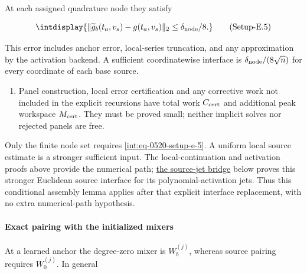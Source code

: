 
At each assigned quadrature node they satisfy


\label{int:eq-setup-e-5}
\begingroup\renewcommand{\theHequation}{intdisplay.1005}
\begin{equation}
\intdisplay{
\|\widetilde g_b(t_a,v_s)-g(t_a,v_s)\|_2
                         \le\delta_{\rm node}/8.
}
\tag{Setup-E.5}
\label{int:eq-0520-setup-e-5}
\end{equation}
\endgroup


This error includes anchor error, local-series truncation, and any approximation by the activation backend. A sufficient coordinatewise interface is \(\delta_{\rm node}/(8\sqrt n)\) for every coordinate of each base source.


\begin{enumerate}
\item[3.] Panel construction, local error certification and any corrective work not included in the explicit recursions have total work \(C_{\rm cert}\) and additional peak workspace \(M_{\rm cert}\). They must be proved small; neither implicit solves nor rejected panels are free.
\end{enumerate}


Only the finite node set requires \hyperref[int:eq-setup-e-5]{\eqref{int:eq-0520-setup-e-5}}. A uniform local source estimate is a stronger sufficient input. The local-continuation and activation proofs above provide the numerical path; \hyperref[int:setup-bridge]{the source-jet bridge} below proves this stronger Euclidean source interface for its polynomial-activation jets. Thus this conditional assembly lemma applies after that explicit interface replacement, with no extra numerical-path hypothesis.


\paragraph{Exact pairing with the initialized mixers}
\label{int:setup-assembly-2}
\mbox{}\par\smallskip


At a learned anchor the degree-zero mixer is \(W_b^{(j)}\), whereas source pairing requires \(W_0^{(j)}\). In general


